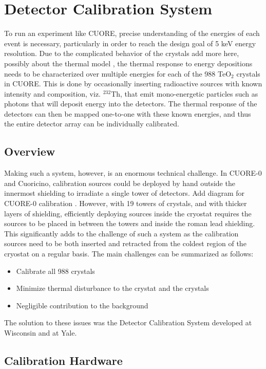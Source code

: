 \chapter{Detector Calibration System}

To run an experiment like CUORE, precise understanding of the energies of each event is necessary, particularly in order to reach the design goal of 5 keV energy resolution. Due to the complicated behavior of the crystals \color{red} add more here, possibly about the thermal model \color{black}, the thermal response to energy depositions needs to be characterized over multiple energies for each of the 988 TeO$_2$ crystals in CUORE. This is done by occasionally inserting radioactive sources with known intensity and composition, viz. $^232$Th, that emit mono-energetic particles such as photons that will deposit energy into the detectors. The thermal response of the detectors can then be mapped one-to-one with these known energies, and thus the entire detector array can be individually calibrated.

\section{Overview}

Making such a system, however, is an enormous technical challenge. In CUORE-0 and Cuoricino, calibration sources could be deployed by hand outside the innermost shielding to irradiate a single tower of detectors. \color{red} Add diagram for CUORE-0 calibration \color{black}. However, with 19 towers of crystals, and with thicker layers of shielding, efficiently deploying sources inside the cryostat requires the sources to be placed in between the towers and inside the roman lead shielding. This significantly adds to the challenge of such a system as the calibration sources need to be both inserted and retracted from the coldest region of the cryostat on a regular basis. The main challenges can be summarized as follows: 
\begin{itemize}
\item Calibrate all 988 crystals
\item Minimize thermal disturbance to the crystat and the crystals
\item Negligible contribution to the background
\end{itemize}

The solution to these issues was the Detector Calibration System developed at Wisconsin and at Yale.

\section{Calibration Hardware}

